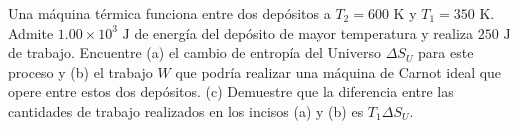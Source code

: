 \item Una máquina térmica funciona entre dos depósitos a $T_2 = 600\text{ K}$ y $T_1 = 350\text{ K}$. Admite $1.00 \times 10^3\text{ J}$ de energía del depósito de mayor temperatura y realiza $250\text{ J}$ de trabajo. Encuentre (a) el cambio de entropía del Universo $\Delta S_U$ para este proceso y (b) el trabajo $W$ que podría realizar una máquina de Carnot ideal que opere entre estos dos depósitos. (c) Demuestre que la diferencia entre las cantidades de trabajo realizados en los incisos (a) y (b) es $T_1 \Delta S_U$.
